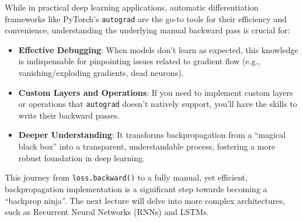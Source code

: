While in practical deep learning applications, automatic differentiation frameworks like PyTorch's \texttt{autograd} are the go-to tools for their efficiency and convenience, understanding the underlying manual backward pass is crucial for:
\begin{itemize}
    \item \textbf{Effective Debugging}: When models don't learn as expected, this knowledge is indispensable for pinpointing issues related to gradient flow (e.g., vanishing/exploding gradients, dead neurons).
    \item \textbf{Custom Layers and Operations}: If you need to implement custom layers or operations that \texttt{autograd} doesn't natively support, you'll have the skills to write their backward passes.
    \item \textbf{Deeper Understanding}: It transforms backpropagation from a ``magical black box'' into a transparent, understandable process, fostering a more robust foundation in deep learning.
\end{itemize}

This journey from \texttt{loss.backward()} to a fully manual, yet efficient, backpropagation implementation is a significant step towards becoming a ``backprop ninja''. The next lecture will delve into more complex architectures, such as Recurrent Neural Networks (RNNs) and LSTMs.